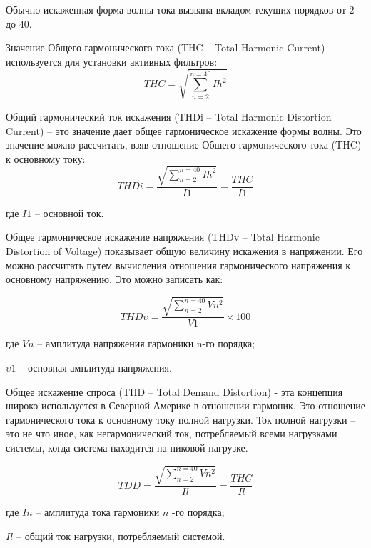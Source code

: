 Обычно искаженная форма волны тока вызвана вкладом текущих порядков от $2$ до $40$. 

Значение Общего гармонического тока (THC – Total Harmonic Current) используется для установки активных фильтров:
\begin{equation}
	\label{eq:equation1.13}
	THC = \sqrt{\displaystyle\sum_{n=2}^{n=40} Ih^2}
\end{equation} 

Общий гармонический ток искажения (THDi – Total Harmonic Distortion Current) -- это значение дает общее гармоническое искажение формы волны. Это значение можно рассчитать, взяв отношение Обшего гармонического тока (THC) к основному току:
\begin{equation}
	\label{eq:equation1.14}
	THDi = \frac{\sqrt{\displaystyle\sum_{n=2}^{n=40} Ih^2}}{I1} = \frac{THC}{I1}
\end{equation} 

где $I1$ – основной ток.

Общее гармоническое искажение напряжения (THDv – Total Harmonic Distortion of Voltage) показывает общую величину искажения в напряжении. Его можно рассчитать путем вычисления отношения гармонического напряжения к основному напряжению. Это можно записать как:

\begin{equation}
	\label{eq:equation1.15}
	THD\upsilon = \frac{\sqrt{\displaystyle\sum_{n=2}^{n=40} Vn^2}}{V1} \times 100 
\end{equation} 

где $Vn$ – амплитуда напряжения гармоники n-го порядка;

$\upsilon 1$ – основная амплитуда напряжения.

Общее искажение спроса (THD – Total Demand Distortion) - эта концепция широко используется в Северной Америке в отношении гармоник. Это отношение гармонического тока к основному току полной нагрузки. Ток полной нагрузки – это не что иное, как негармонический ток, потребляемый всеми нагрузками системы, когда система находится на пиковой нагрузке.

\begin{equation}
	\label{eq:equation1.16}
	TDD = \frac{\sqrt{\displaystyle\sum_{n=2}^{n=40} Vn^2}}{Il} = \frac{THC}{Il}
\end{equation} 

где $In$ – амплитуда тока гармоники $n$ -го порядка;

$Il$ – общий ток нагрузки, потребляемый системой.

